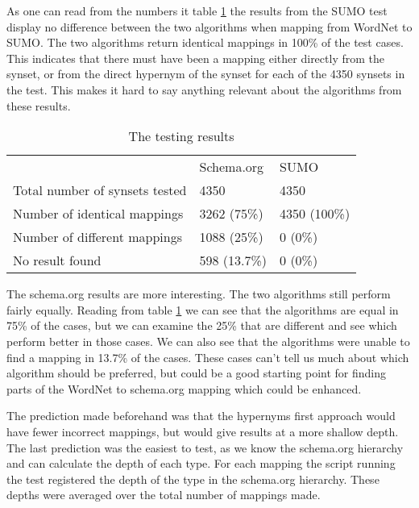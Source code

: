 As one can read from the numbers it table \ref{table:AlgorithmResults} the results from the SUMO test
display no difference between the two algorithms when mapping from WordNet to SUMO.
The two algorithms return identical mappings in 100\% of the test cases.
This indicates that there must have been a mapping either directly from the synset,
or from the direct hypernym of the synset for each of the 4350 synsets in the test.
This makes it hard to say anything relevant about the algorithms from these results.

\begin{table}[ht] %
	\centering
	\begin{tabular}{lll}
										& Schema.org	& SUMO			\\
		Total number of synsets tested 	& 4350			& 4350			\\
		Number of identical mappings 	& 3262 (75\%)	& 4350 (100\%)	\\
		Number  of different mappings	& 1088 (25\%)	& 0	(0\%)		\\
		No result found					& 598  (13.7\%)	& 0	(0\%)
	\end{tabular}
	\caption{The testing results}
	\label{table:AlgorithmResults}
\end{table}

The schema.org results are more interesting.
The two algorithms still perform fairly equally.
Reading from table \ref{table:AlgorithmResults} we can see that the algorithms are equal in 75\% of the cases,
but we can examine the 25\% that are different and see which perform better in those cases.
We can also see that the algorithms were unable to find a mapping in 13.7\% of the cases.
These cases can't tell us much about which algorithm should be preferred,
but could be a good starting point for finding parts of the WordNet to schema.org mapping which could be enhanced.

The prediction made beforehand was that the hypernyms first approach would have fewer incorrect mappings,
but would give results at a more shallow depth.
The last prediction was the easiest to test, as we know the schema.org hierarchy and can calculate the depth of each type.
For each mapping the script running the test registered the depth of the type in the schema.org hierarchy.
These depths were averaged over the total number of mappings made.

